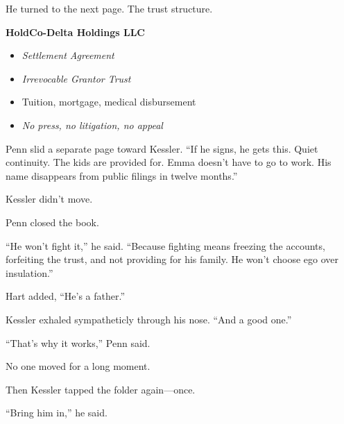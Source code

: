 He turned to the next page. The trust structure.

\textbf{HoldCo-Delta Holdings LLC}
\begin{itemize}
    \item \textit{Settlement Agreement}
    \item \textit{Irrevocable Grantor Trust}
    \item Tuition, mortgage, medical disbursement
    \item \textit{No press, no litigation, no appeal}
\end{itemize}

Penn slid a separate page toward Kessler. “If he signs, he gets this. Quiet continuity. 
The kids are provided for. Emma doesn't have to go to work. His name disappears from public 
filings in twelve months.”

Kessler didn’t move.

Penn closed the book.

“He won’t fight it,” he said. “Because fighting means freezing the accounts, forfeiting the trust, 
and not providing for his family. He won’t choose ego over insulation.”

Hart added, “He’s a father.”

Kessler exhaled sympatheticly through his nose. “And a good one.”

“That’s why it works,” Penn said.

No one moved for a long moment.

Then Kessler tapped the folder again—once.

“Bring him in,” he said.

\medskip


